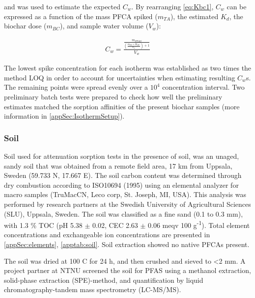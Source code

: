 and was used to estimate the expected $C_w$. By rearranging \cref{eq:Kbc1}, $C_w$ can be expressed as a function of the mass PFCA spiked ($m_{TA}$), the estimated $K_d$, the biochar dose ($m_{BC}$), and sample water volume ($V_w$):

\begin{align}
    \label{eq:Cw2}
    C_w=\frac{\frac{m_{PFAS}}{\left (\frac{m_{BC}\times K_{BC}}{V_w}\right)+1}}{V_w}
\end{align}

The lowest spike concentration for each isotherm was established as two times the method LOQ in order to account for uncertainties when estimating resulting $C_w$s. The remaining points were spread evenly over a $10^4$ concentration interval. Two preliminary batch tests were prepared to check how well the preliminary estimates matched the sorption affinities of the present biochar samples (more information in \cref{appSec:IsothermSetup}).
 
\subsubsection{Soil}
Soil used for attenuation sorption tests in the presence of soil, was an unaged, sandy soil that was obtained from a remote field area, 17 km from Uppsala, Sweden (59.733 N, 17.667 E). The soil carbon content was determined through dry combustion according to ISO10694 (1995) using an elemental analyzer for macro samples (TruMac\textregistered CN, Leco corp, St. Joseph, MI, USA). This analysis was performed by research partners at the Swedish University of Agricultural Sciences (SLU), Uppsala, Sweden. The soil was classified as a fine sand (0.1 to 0.3 mm), with 1.3 \% TOC (pH 5.38 $\pm$ 0.02, CEC 2.63 $\pm$ 0.06 meqv 100 g\textsuperscript{-1}). Total element concentrations and exchangeable ion concentrations are presented in \cref{appSec:elements}, \cref{apptab:soil}. Soil extraction showed no native PFCAs present.

The soil was dried at 100 \textdegree C for 24 h, and then crushed and sieved to \textless 2 mm. A project partner at NTNU screened the soil for PFAS using a methanol extraction, solid-phase extraction (SPE)-method, and quantification by liquid chromatography-tandem mass spectrometry (LC-MS/MS). 

